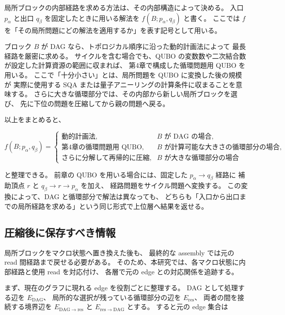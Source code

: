 \documentclass[a4j,10pt]{ujarticle}
\begin{document}
局所ブロックの内部経路を求める方法は、その内部構造によって決める。
入口 $p_\alpha$ と出口 $q_\beta$ を固定したときに用いる解法を
$f(B;p_\alpha,q_\beta)$ と書く。
ここでは $f$ を「その局所問題にどの解法を適用するか」を表す記号として用いる。

ブロック $B$ が DAG なら、トポロジカル順序に沿った動的計画法によって
最長経路を厳密に求める。
サイクルを含む場合でも、QUBO の変数数や二次結合数が設定した計算資源の範囲に収まれば、
第4章で構成した循環問題用 QUBO を用いる。
ここで「十分小さい」とは、局所問題を QUBO に変換した後の規模が
実際に使用する SQA または量子アニーリングの計算条件に収まることを意味する。
さらに大きな循環部分では、その内部から新しい局所ブロックを選び、
先に下位の問題を圧縮してから親の問題へ戻る。

以上をまとめると、

\[
f(B;p_\alpha,q_\beta)
=
\begin{cases}
\text{動的計画法},
& B\text{ が DAG の場合},\\
\text{第4章の循環問題用 QUBO},
& B\text{ が計算可能な大きさの循環部分の場合},\\
\text{さらに分解して再帰的に圧縮},
& B\text{ が大きな循環部分の場合}
\end{cases}
\]

と整理できる。
前章の QUBO を用いる場合には、固定した $p_\alpha\rightarrow q_\beta$ 経路に
補助頂点 $r$ と $q_\beta\rightarrow r\rightarrow p_\alpha$ を加え、
経路問題をサイクル問題へ変換する。
この変換によって、DAG と循環部分で解法は異なっても、
どちらも「入口から出口までの局所経路を求める」という同じ形式で上位層へ結果を返せる。

\subsection{圧縮後に保存すべき情報}
\label{subsec:compression_exactness}

局所ブロックをマクロ状態へ置き換えた後も、
最終的な assembly では元の read 間経路まで戻せる必要がある。
そのため、本研究では、各マクロ状態に内部経路と使用 read を対応付け、
各層で元の edge との対応関係を追跡する。

まず、現在のグラフに現れる edge を役割ごとに整理する。
DAG として処理する辺を $E_{\mathrm{DAG}}$、
局所的な選択が残っている循環部分の辺を $E_{\mathrm{res}}$、
両者の間を接続する境界辺を
$E_{\mathrm{DAG}\rightarrow\mathrm{res}}$ と
$E_{\mathrm{res}\rightarrow\mathrm{DAG}}$ とする。
すると元の edge 集合は
\end{document}
